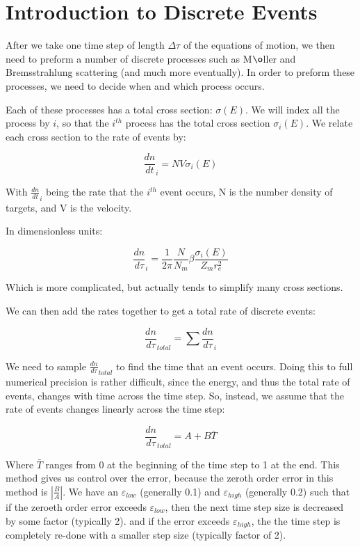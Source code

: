 \documentclass[]{article}
\begin{document}
\section{Introduction to Discrete Events}

After we take one time step of length $\Delta \tau$ of the equations of motion, we then need to preform a number of discrete processes such as M$\o$ller and Bremsstrahlung scattering (and much more eventually). In order to preform these processes, we need to decide when and which process occurs. 

Each of these processes has a total cross section: $\sigma(E)$. We will index all the process by $i$, so that the $i^{th}$ process has the total cross section $\sigma_i(E)$. We relate each cross section to the rate of events by:

\begin{equation}
\frac{dn}{dt}_i = N V \sigma_i(E)
\end{equation}

With $\frac{dn}{dt}_i$ being the rate that the $i^{th}$ event occurs, N is the number density of targets, and V is the velocity.

In dimensionless units:

\begin{equation} \label{eq:CS_rate}
\frac{dn}{d\tau}_{i} = \frac{1}{2 \pi} \frac{N}{N_m} \beta \frac{\sigma_i(E)}{Z_mr_e^2}
\end{equation}

Which is more complicated, but actually tends to simplify many cross sections.

We can then add the rates together to get a total rate of discrete events:

\begin{equation}
\frac{dn}{d\tau}_{total} = \sum \frac{dn}{d\tau}_{i}
\end{equation}

We need to sample $\frac{dn}{d\tau}_{total}$ to find the time that an event occurs. Doing this to full numerical precision is rather difficult, since the energy, and thus the total rate of events, changes with time across the time step. So, instead, we assume that the rate of events changes linearly across the time step:

\begin{equation}
\frac{dn}{d\tau}_{total} = A + B\bar{T}
\end{equation}

Where $\bar{T}$ ranges from 0 at the beginning of the time step to 1 at the end. This method gives us control over the error, because the zeroth order error in this method is $\left| \frac{B}{A} \right| $. We have an $ \varepsilon_{low}$ (generally 0.1) and $ \varepsilon_{high}$ (generally 0.2) such that if the zeroeth order error exceeds $ \varepsilon_{low}$, then the next time step size is decreased by some factor (typically 2). and if the error exceeds  $ \varepsilon_{high}$, the the time step is completely re-done with a smaller step size (typically factor of 2). 
\end{document}
